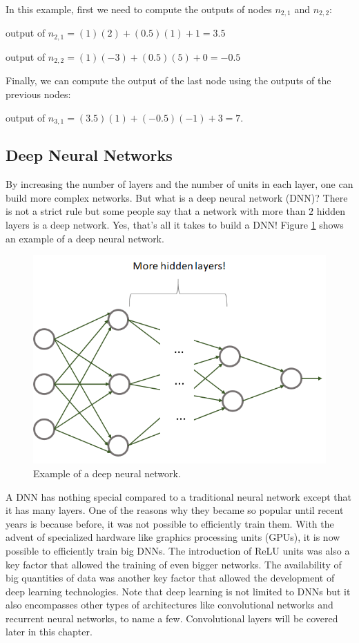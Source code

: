 \documentclass[
  11pt,
]{krantz}
\begin{document}
In this example, first we need to compute the outputs of nodes \(n_{2,1}\) and \(n_{2,2}\):

output of \(n_{2,1} = (1)(2) + (0.5)(1) + 1 = 3.5\)

output of \(n_{2,2} = (1)(-3) + (0.5)(5) + 0 = -0.5\)

Finally, we can compute the output of the last node using the outputs of the previous nodes:

output of \(n_{3,1} = (3.5)(1) + (-0.5)(-1) + 3 = 7\).

\hypertarget{deep-neural-networks}{%
\subsection{Deep Neural Networks}\label{deep-neural-networks}}

By increasing the number of layers and the number of units in each layer, one can build more complex networks. But what is a deep neural network (DNN)? There is not a strict rule but some people say that a network with more than \(2\) hidden layers is a deep network. Yes, that's all it takes to build a DNN! Figure \ref{fig:nnDNN} shows an example of a deep neural network.

\begin{figure}

{\centering \includegraphics[width=0.5\linewidth]{images/nn_dnn} 

}

\caption{Example of a deep neural network.}\label{fig:nnDNN}
\end{figure}

A DNN has nothing special compared to a traditional neural network except that it has many layers. One of the reasons why they became so popular until recent years is because before, it was not possible to efficiently train them. With the advent of specialized hardware like graphics processing units (GPUs), it is now possible to efficiently train big DNNs. The introduction of ReLU units was also a key factor that allowed the training of even bigger networks. The availability of big quantities of data was another key factor that allowed the development of deep learning technologies. Note that deep learning is not limited to DNNs but it also encompasses other types of architectures like convolutional networks and recurrent neural networks, to name a few. Convolutional layers will be covered later in this chapter.
\end{document}
